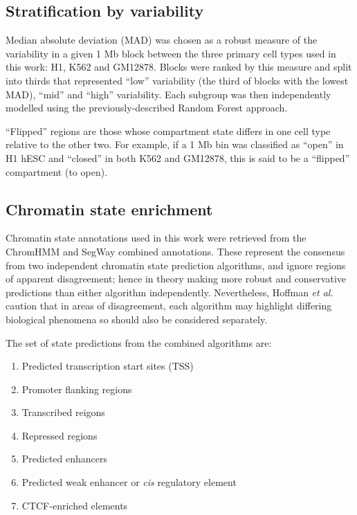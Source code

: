 \documentclass[a4paper,11pt,oneside]{book}
\begin{document}
\subsection{Stratification by
variability}\label{sec:variable}

Median absolute deviation (MAD) was chosen as a robust measure of the
variability in a given 1 Mb block between the three primary cell types
used in this work: H1, K562 and GM12878. Blocks were ranked by this
measure and split into thirds that represented ``low'' variability (the
third of blocks with the lowest MAD), ``mid'' and ``high'' variability.
Each subgroup was then independently modelled using the
previously-described Random Forest approach.

``Flipped'' regions are those whose compartment state differs in one
cell type relative to the other two. For example, if a 1 Mb bin was
classified as ``open'' in H1 hESC and ``closed'' in both K562 and
GM12878, this is said to be a ``flipped'' compartment (to open).

\subsection{Chromatin state enrichment}\label{enhancer-enrichment}

Chromatin state annotations used in this work were retrieved from the ChromHMM\cite{Ernst2011} and SegWay\cite{Hoffman2012} combined annotations.\cite{Hoffman2013} These represent the consensus from two independent chromatin state prediction algorithms, and ignore regions of apparent disagreement; hence in theory making more robust and conservative predictions than either algorithm independently. Nevertheless, Hoffman \emph{et al.} caution that in areas of disagreement, each algorithm may highlight differing biological phenomena so should also be considered separately.\cite{Hoffman2013}

The set of state predictions from the combined algorithms are:
\begin{enumerate}
\item Predicted transcription start sites (TSS)
\item Promoter flanking regions
\item Transcribed reigons
\item Repressed regions
\item Predicted enhancers
\item Predicted weak enhancer or \emph{cis} regulatory element
\item CTCF-enriched elements
\end{enumerate}
\end{document}
